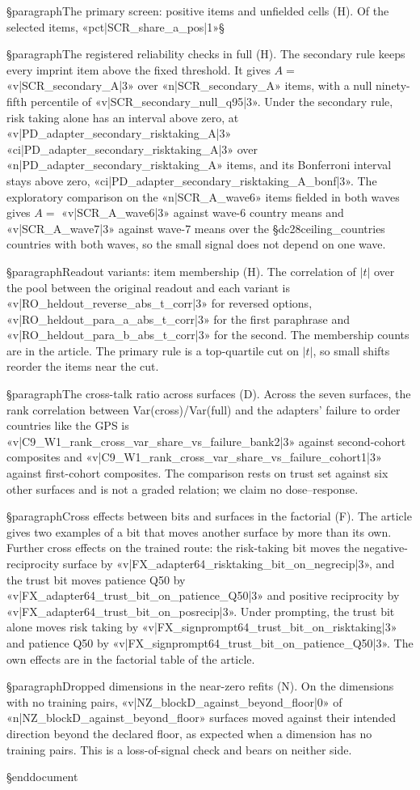 §paragraph{The primary screen: positive items and unfielded cells (H).} Of the selected items, «pct|SCR_share_a_pos|1»§%

§paragraph{The registered reliability checks in full (H).} The secondary rule keeps every imprint item above the fixed threshold. It gives $A=$ «v|SCR_secondary_A|3» over «n|SCR_secondary_A» items, with a null ninety-fifth percentile of «v|SCR_secondary_null_q95|3». Under the secondary rule, risk taking alone has an interval above zero, at «v|PD_adapter_secondary_risktaking_A|3» «ci|PD_adapter_secondary_risktaking_A|3» over «n|PD_adapter_secondary_risktaking_A» items, and its Bonferroni interval stays above zero, «ci|PD_adapter_secondary_risktaking_A_bonf|3». The exploratory comparison on the «n|SCR_A_wave6» items fielded in both waves gives $A=$ «v|SCR_A_wave6|3» against wave-6 country means and «v|SCR_A_wave7|3» against wave-7 means over the §dc{28}{ceiling_countries} countries with both waves, so the small signal does not depend on one wave.

§paragraph{Readout variants: item membership (H).} The correlation of $|t|$ over the pool between the original readout and each variant is «v|RO_heldout_reverse_abs_t_corr|3» for reversed options, «v|RO_heldout_para_a_abs_t_corr|3» for the first paraphrase and «v|RO_heldout_para_b_abs_t_corr|3» for the second. The membership counts are in the article. The primary rule is a top-quartile cut on $|t|$, so small shifts reorder the items near the cut.

§paragraph{The cross-talk ratio across surfaces (D).} Across the seven surfaces, the rank correlation between Var(cross)/Var(full) and the adapters' failure to order countries like the GPS is «v|C9_W1_rank_cross_var_share_vs_failure_bank2|3» against second-cohort composites and «v|C9_W1_rank_cross_var_share_vs_failure_cohort1|3» against first-cohort composites. The comparison rests on trust set against six other surfaces and is not a graded relation; we claim no dose--response.

§paragraph{Cross effects between bits and surfaces in the factorial (F).} The article gives two examples of a bit that moves another surface by more than its own. Further cross effects on the trained route: the risk-taking bit moves the negative-reciprocity surface by «v|FX_adapter64_risktaking_bit_on_negrecip|3», and the trust bit moves patience Q50 by «v|FX_adapter64_trust_bit_on_patience_Q50|3» and positive reciprocity by «v|FX_adapter64_trust_bit_on_posrecip|3». Under prompting, the trust bit alone moves risk taking by «v|FX_signprompt64_trust_bit_on_risktaking|3» and patience Q50 by «v|FX_signprompt64_trust_bit_on_patience_Q50|3». The own effects are in the factorial table of the article.

§paragraph{Dropped dimensions in the near-zero refits (N).} On the dimensions with no training pairs, «v|NZ_blockD_against_beyond_floor|0» of «n|NZ_blockD_against_beyond_floor» surfaces moved against their intended direction beyond the declared floor, as expected when a dimension has no training pairs. This is a loss-of-signal check and bears on neither side.

§end{document}
